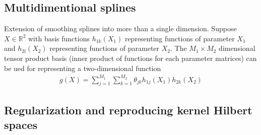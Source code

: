\documentclass{article}
\begin{document}
\subsection{Multidimentional splines}
Extension of smoothing splines into more than a single dimension. Suppose $X \in \mathbb{R}^2$ with basis functions $h_{1k}(X_1)$ representing functions of parameter $X_1$ and $h_{2l}(X_2)$ representing functions of parameter $X_2$. The $M_1 \times M_2$ dimensional tensor product basis (inner product of functions for each parameter matrices) can be ued for representing a two-dimensional function
\begin{align*}
  g(X) = \sum_{j=1}^{M_1}\sum_{k=1}^{M_2}\theta_{jk}h_{1j}(X_1)h_{2k}(X_2)
\end{align*}

\subsection{Regularization and reproducing kernel Hilbert spaces}
\end{document}
